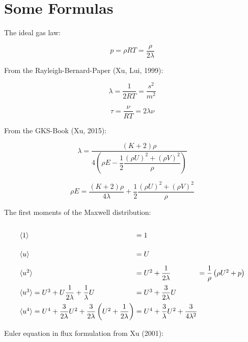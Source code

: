 \documentclass[
	pdftex,             %
	12pt,				%
	a4paper,		   	%
	english,				%
	oneside,			%
]{article}
\newcommand{\mom}[1]{\langle #1 \rangle}
\begin{document}
\clearpage

\section{Some Formulas}

The ideal gas law:

\begin{equation}
p = \rho RT = \dfrac{\rho}{2 \lambda}
\end{equation}

From the Rayleigh-Bernard-Paper (Xu, Lui, 1999):

\begin{equation}
\lambda = \frac{1}{2RT} = \dfrac{s^2}{m^2}
\end{equation}

\begin{equation}
\tau = \frac{\nu}{RT} = 2\lambda\nu
\end{equation}

From the GKS-Book (Xu, 2015):

\begin{equation}
\lambda =\frac{(K+2)\rho}
{4\left( \rho E - \dfrac{1}{2} \dfrac{(\rho U)^2 + (\rho V)^2}{\rho}  \right)}
\end{equation}

\begin{equation}
\rho E = \dfrac{(K+2)\rho}{4\lambda} + \dfrac{1}{2} \dfrac{(\rho U)^2 + (\rho V)^2}{\rho}
\end{equation}

The first moments of the Maxwell distribution:

\begin{equation}
\arraycolsep=1.4pt\def\arraystretch{2.2}
\begin{array}{lcll}
\mom{1} &=& 1 &\\
\mom{u} &=& U &\\
\mom{u^2} &=& U^2 + \dfrac{1}{2\lambda} & = \dfrac{1}{\rho} \left( \rho U^2 + p \right) \\
\mom{u^3} = U^3 + U\dfrac{1}{2\lambda} + \dfrac{1}{\lambda} U &=& U^3 + \dfrac{3}{2\lambda} U &\\
\mom{u^4} = U^4 + \dfrac{3}{2\lambda} U^2 + \dfrac{3}{2\lambda} \left(U^2 + \dfrac{1}{2\lambda} \right)
		  &=& U^4 + \dfrac{3}{\lambda} U^2 + \dfrac{3}{4\lambda^2}&
\end{array}
\end{equation}

Euler equation in flux formulation from Xu (2001):
\end{document}
